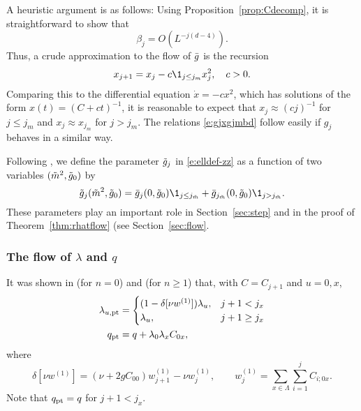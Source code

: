 \begin{rk}
A heuristic argument is as follows: Using Proposition~\ref{prop:Cdecomp}, it is
straightforward to show that
\begin{equation}
\beta_j = O(L^{-j (d - 4)}).
\end{equation}
Thus, a crude approximation to the flow of $\bar{g}$ is the recursion
\begin{equation}
x_{j+1} = x_j - c \1_{j \le j_m} x_j^2,
	\quad
c > 0.
\end{equation}
Comparing this to the differential equation $\dot x = - c x^2$, which has solutions
of the form $x(t) = (C + c t)^{-1}$, it is reasonable to expect that $x_j \approx (c j)^{-1}$
for $j \le j_m$ and $x_j \approx x_{j_m}$ for $j > j_m$. The relations \eqref{e:gjxgjmbd}
follow easily if $g_j$ behaves in a similar way.
\end{rk}

Following \cite[\eqref{log-e:ggendef}]{BBS-saw4-log}, we define the parameter
$\tilde{g}_j$ in \eqref{e:elldef-zz} as a function of two variables $(\tilde{m}^2, \tilde{g}_0)$ by
\begin{equation}
\label{e:ggendef}
\ggen_j(\mgen^2,\ggen_0)
	=
\gbar_j(0,\ggen_0) \1_{j \le j_{\mgen}} + \gbar_{j_{\mgen}}(0,\ggen_0) \1_{j > j_{\mgen}}.
\end{equation}
These parameters play an important role in Section~\ref{sec:step} and in the proof of
Theorem~\ref{thm:rhatflow} (see Section~\ref{sec:flow}.

\subsubsection{The flow of \texorpdfstring{$\lambda$ and $q$}{lambda and q}}

It was shown in \cite[\eqref{pt-e:lambdapt2}--\eqref{pt-e:qpt2}]{BBS-rg-pt} (for $n = 0$)
and \cite[Proposition~\ref{phi4-prop:pt}]{ST-phi4} (for $n \ge 1$) that,
with $C = C_{j+1}$ and $u = 0, x$,
\begin{align}
\label{e:lampt}
\lambda_{u,{\rm pt}}
	&=
\begin{cases}
(1 - \delta[\nu w^{(1)}]) \lambda_u,
	& j + 1 < j_x \\
\lambda_u,
	& j + 1 \ge j_x
\end{cases}
	\\
\label{e:qpt}
q_{\rm pt}
	&=
q + \lambda_0 \lambda_x C_{0x},
\end{align}
where
\begin{equation}
\label{e:deltanuw1}
\delta[\nu w^{(1)}] = (\nu + 2 g C_{00}) w^{(1)}_{j+1} - \nu w^{(1)}_j,
	\qquad
w^{(1)}_j = \sum_{x\in\Lambda} \sum_{i=1}^j C_{i;0x}.
\end{equation}
Note that $q_{\rm pt} = q$ for $j + 1 < j_x$.

